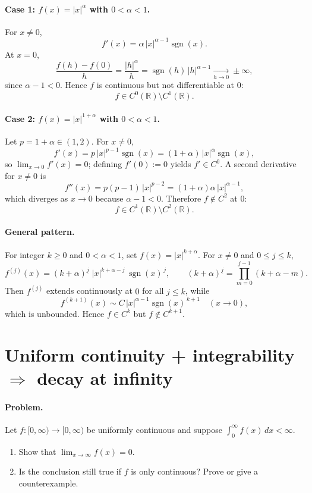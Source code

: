\documentclass[12pt,a4paper]{article}
\begin{document}
\paragraph{Case 1: $f(x)=|x|^{\alpha}$ with $0<\alpha<1$.}
For $x\neq 0$,
\[
f'(x)=\alpha\,|x|^{\alpha-1}\operatorname{sgn}(x).
\]
At $x=0$,
\[
\frac{f(h)-f(0)}{h}=\frac{|h|^\alpha}{h}=\operatorname{sgn}(h)\,|h|^{\alpha-1}\xrightarrow[h\to 0]{}\pm\infty,
\]
since $\alpha-1<0$. Hence $f$ is continuous but not differentiable at $0$:
\[
f\in C^0(\mathbb{R})\setminus C^1(\mathbb{R}).
\]

\paragraph{Case 2: $f(x)=|x|^{1+\alpha}$ with $0<\alpha<1$.}
Let $p=1+\alpha\in(1,2)$. For $x\neq 0$,
\[
f'(x)=p\,|x|^{p-1}\operatorname{sgn}(x)=(1+\alpha)\,|x|^{\alpha}\operatorname{sgn}(x),
\]
so $\lim_{x\to 0} f'(x)=0$; defining $f'(0):=0$ yields $f'\in C^0$.
A second derivative for $x\neq 0$ is
\[
f''(x)=p(p-1)\,|x|^{p-2}=(1+\alpha)\alpha\,|x|^{\alpha-1},
\]
which diverges as $x\to 0$ because $\alpha-1<0$. Therefore $f\notin C^2$ at $0$:
\[
f\in C^1(\mathbb{R})\setminus C^2(\mathbb{R}).
\]

\paragraph{General pattern.}
For integer $k\ge 0$ and $0<\alpha<1$, set $f(x)=|x|^{k+\alpha}$. For $x\neq 0$ and $0\le j\le k$,
\[
f^{(j)}(x)=(k+\alpha)^{\underline{j}}\;|x|^{k+\alpha-j}\,\operatorname{sgn}(x)^{\,j},\qquad
(k+\alpha)^{\underline{j}}=\prod_{m=0}^{j-1}(k+\alpha-m).
\]
Then $f^{(j)}$ extends continuously at $0$ for all $j\le k$, while
\[
f^{(k+1)}(x)\sim C\,|x|^{\alpha-1}\operatorname{sgn}(x)^{\,k+1}\quad (x\to 0),
\]
which is unbounded. Hence $f\in C^{k}$ but $f\notin C^{k+1}$.

\section*{Uniform continuity + integrability $\Rightarrow$ decay at infinity}

\paragraph{Problem.}
Let $f:[0,\infty)\to[0,\infty)$ be uniformly continuous and suppose $\int_0^\infty f(x)\,dx<\infty$.
\begin{enumerate}
	\item[(a)] Show that $\lim_{x\to\infty} f(x)=0$.
	\item[(b)] Is the conclusion still true if $f$ is only continuous? Prove or give a counterexample.
\end{enumerate}
\end{document}
